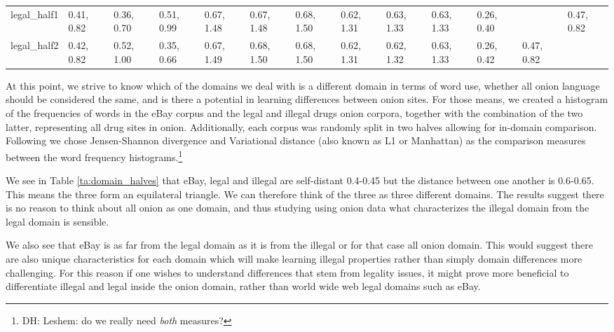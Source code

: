 \documentclass[11pt,a4paper]{article}
\newcommand{\daniel}[1]{\footnote{\color{brown}DH: #1}}
\begin{document}
\begin{table*}[]
{\begin{tabular}{@{}lllllllllllll@{}}
			legal\_half1     & 0.41, 0.82 & 0.36, 0.70       & 0.51, 0.99       & 0.67, 1.48 & 0.67, 1.48  & 0.68, 1.50  & 0.62, 1.31 & 0.63, 1.33     & 0.63, 1.33     & 0.26, 0.40 &              & 0.47, 0.82   \\
			legal\_half2     & 0.42, 0.82 & 0.52, 1.00       & 0.35, 0.66       & 0.67, 1.49 & 0.68, 1.50  & 0.68, 1.50  & 0.62, 1.31 & 0.62, 1.32     & 0.63, 1.33     & 0.26, 0.42 & 0.47, 0.82   &             
		\end{tabular}%
	}
	\caption{Jensen-Shannon divergence and Variational distance between word distribution in all onion drug sites, legal and illegal onion drug sites, and eBay sites.
	Each domain was also split in half for within-domain comparison. \label{ta:domain_halves}}
	
\end{table*}
At this point, we strive to know which of the domains we deal with is a different domain in terms of word use, whether all onion language should be considered the same, and is there a potential in learning differences between onion sites. For those means, we created a histogram of the frequencies of words in the eBay corpus and the legal and illegal drugs onion corpora, together with the combination of the two latter, representing all drug sites in onion. Additionally, each corpus was randomly split in two halves allowing for in-domain comparison. Following \citet{Plank2011EffectiveMO} we chose Jensen-Shannon divergence and Variational distance (also known as L1 or Manhattan) as the comparison measures between the word frequency histograms.\daniel{Leshem: do we really need \textit{both} measures?}

We see in Table \ref{ta:domain_halves} that eBay, legal and illegal are self-distant 0.4-0.45 but the distance between one another is 0.6-0.65. This means the three form an equilateral triangle. We can therefore think of the three as three different domains. The results suggest there is no reason to think about all onion as one domain, and thus studying using onion data what characterizes the illegal domain from the legal domain is sensible.

We also see that eBay is as far from the legal domain as it is from the illegal or for that case all onion domain. This would suggest there are also unique characteristics for each domain which will make learning illegal properties rather than simply domain differences more challenging. For this reason if one wishes to understand differences that stem from legality issues, it might prove more beneficial to differentiate illegal and legal inside the onion domain, rather than world wide web legal domains such as eBay.
\end{document}
